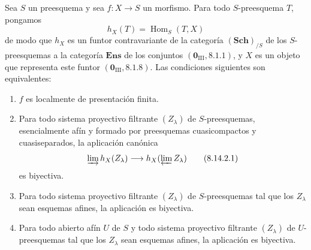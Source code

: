 \begin{proposition}[8.14.2]
\label{IV.8.14.2-fr}
Sea $S$ un preesquema y sea $f:X\to S$ un morfismo.
Para todo $S$-preesquema $T$, pongamos
\[
h_X(T)=\operatorname{Hom}_S(T,X)
\]
de modo que $h_X$ es un funtor contravariante de la categoría $(\mathbf{Sch})_{/S}$ de los $S$-preesquemas a la categoría $\mathbf{Ens}$ de los conjuntos $(\mathbf 0_{\mathrm{III}},8.1.1)$, y $X$ es un objeto que representa este funtor $(\mathbf 0_{\mathrm{III}},8.1.8)$.
Las condiciones siguientes son equivalentes:
\begin{enumerate}[label=\emph{\alph*)}]
  \item $f$ es localmente de presentación finita.
  \item Para todo sistema proyectivo filtrante $(Z_\lambda)$ de $S$-preesquemas, esencialmente afín  y formado por preesquemas cuasicompactos y cuasiseparados, la aplicación canónica 
\begin{equation}
\label{IV.8.14.2.1-fr}
\varinjlim h_X(Z_\lambda)
\longrightarrow h_X(\varprojlim Z_\lambda) \tag{8.14.2.1}
\end{equation}
es biyectiva.
  \item Para todo sistema proyectivo filtrante $(Z_\lambda)$ de $S$-preesquemas tal que los $Z_\lambda$ sean esquemas afines, la aplicación  es biyectiva.
  \item[\rm c$'$)] Para todo abierto afín $U$ de $S$ y todo sistema proyectivo filtrante $(Z_\lambda)$ de $U$-preesquemas tal que los $Z_\lambda$ sean esquemas afines, la aplicación  es biyectiva.
\end{enumerate}
\end{proposition}

